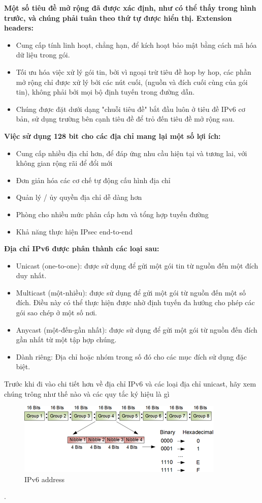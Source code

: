 \documentclass{report}
\begin{document}
\textbf{Một số tiêu đề mở rộng đã được xác định, như có thể thấy trong hình trước, và chúng phải tuân theo thứ tự được hiển thị. Extension headers:}
\begin{itemize}
	\item Cung cấp tính linh hoạt, chẳng hạn, để kích hoạt bảo mật bằng cách mã hóa dữ liệu trong gói.
	\item Tối ưu hóa việc xử lý gói tin, bởi vì ngoại trừ tiêu đề hop by hop, các phần mở rộng chỉ được xử lý bởi các nút cuối, (nguồn và đích cuối cùng của gói tin), không phải bởi mọi bộ định tuyến trong đường dẫn.
	\item Chúng được đặt dưới dạng "chuỗi tiêu đề" bắt đầu luôn ở tiêu đề IPv6 cơ bản, sử dụng trường bên cạnh tiêu đề để trỏ đến tiêu đề mở rộng sau.
\end{itemize}
\textbf{Việc sử dụng 128 bit cho các địa chỉ mang lại một số lợi ích:}
\begin{itemize}
	\item Cung cấp nhiều địa chỉ hơn, để đáp ứng nhu cầu hiện tại và tương lai, với không gian rộng rãi để đổi mới
	\item Đơn giản hóa các cơ chế tự động cấu hình địa chỉ
	\item Quản lý / ủy quyền địa chỉ dễ dàng hơn
	\item Phòng cho nhiều mức phân cấp hơn và tổng hợp tuyến đường
	\item Khả năng thực hiện IPsec end-to-end
\end{itemize}
\textbf{Địa chỉ IPv6 được phân thành các loại sau:}
\begin{itemize}
	\item Unicast (one-to-one): được sử dụng để gửi một gói tin từ nguồn đến một đích duy nhất. 
	\item Multicast (một-nhiều): được sử dụng để gửi một gói từ nguồn đến một số đích. Điều này có thể thực hiện được nhờ định tuyến đa hướng cho phép các gói sao chép ở một số nơi.
	\item Anycast (một-đến-gần nhất): được sử dụng để gửi một gói từ nguồn đến đích gần nhất từ một tập hợp chúng.
	\item Dành riêng: Địa chỉ hoặc nhóm trong số đó cho các mục đích sử dụng đặc biệt.
\end{itemize}
Trước khi đi vào chi tiết hơn về địa chỉ IPv6 và các loại địa chỉ unicast, hãy xem chúng trông như thế nào và các quy tắc ký hiệu là gì
\begin{figure}[h]
	\centering
	\includegraphics[scale = 0.7]{fig23.png}
	\caption{IPv6 address}
	\label{fig:Graph23}
\end{figure}. 
\end{document}
